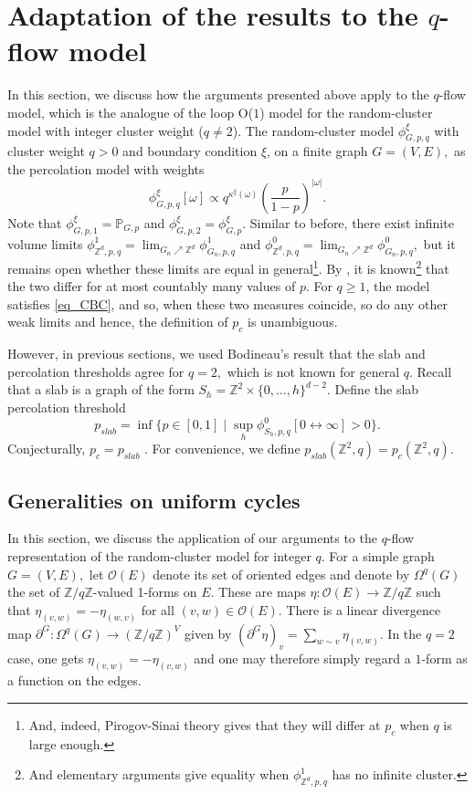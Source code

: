 \documentclass[article,11pt,reqno]{amsart}
\newcommand{\Z}{\mathbb{Z}}
\newcommand{\cc}{\leftrightarrow}
\begin{document}
\section{Adaptation of the results to the \texorpdfstring{$q$}{q}-flow model}\label{sec:qflow}
In this section, we discuss how the arguments presented above apply to the $q$-flow model, which is the analogue of the loop O($1$) model for the random-cluster model with integer cluster weight ($q \neq 2$). The random-cluster model $\phi^{\xi}_{G,p,q}$ with cluster weight $q>0$ and boundary condition $\xi$,  on a finite graph $G=(V,E),$ as the percolation model with weights
$$
\phi^{\xi}_{G,p,q}[\omega]\propto q^{\kappa^{\xi}(\omega)}\left( \frac{p}{1-p}\right)^{|\omega|}.
$$
Note that $\phi^{\xi}_{G,p,1}=\mathbb{P}_{G,p}$ and $\phi^{\xi}_{G,p,2}=\phi^{\xi}_{G,p}$. Similar to before, there exist infinite volume limits $\phi^1_{\mathbb{Z}^d,p,q}=\lim_{G_n\nearrow \mathbb{Z}^d} \phi^1_{G_n,p,q}$ and $\phi^0_{\mathbb{Z}^d,p,q}=\lim_{G_n\nearrow \mathbb{Z}^d} \phi^0_{G_n,p,q},$ but it remains open whether these limits are equal in general\footnote{And, indeed, Pirogov-Sinai theory \cite{Pirogov-Sinai-FK} gives that they will differ at $p_c$ when $q$ is large enough.}. By \cite{Convexity_of_pressure}, it is known\footnote{And elementary arguments give equality when $\phi_{\Z^d,p,q}^1$ has no infinite cluster.} that the two differ for at most countably many values of $p$. For $q \geq 1$, the model satisfies \eqref{eq_CBC}, and so, when these two measures coincide, so do any other weak limits and hence, the definition of $p_c$ is unambiguous.

 However, in previous sections, we used Bodineau's result \cite{Bod05} that the slab and percolation thresholds agree for $q=2,$ which is not known for general $q$. Recall that a slab is a graph of the form $S_h=\mathbb{Z}^2\times \{0,\dots,h\}^{d-2}$.  Define the slab percolation threshold 
 $$
 p_{slab}=\inf\{p\in [0,1]\mid \sup_h\phi^0_{S_h,p,q}[0\cc \infty]>0\}.
 $$
 Conjecturally, $p_c=p_{slab}$ \cite{Pis96}. For convenience, we define $p_{slab}(\Z^2,q) = p_c(\Z^2,q)$.
\subsection{Generalities on uniform cycles}

In this section, we discuss the application of our arguments to the $q$-flow representation of the random-cluster model for integer $q$. For a simple graph $G=(V,E),$ let $\mathcal{O}(E)$ denote its set of oriented edges and denote by $\Omega^q(G)$ the set of $\mathbb{Z}/q\mathbb{Z}$-valued 1-forms on $E.$ These are maps $\eta:\mathcal{O}(E)\to \mathbb{Z}/q\mathbb{Z}$ such that $\eta_{(v,w)}=-\eta_{(w,v)}$ for all $(v,w)\in \mathcal{O}(E)$. There is a linear divergence map $\partial^G:\Omega^q(G)\to (\mathbb{Z}/q\mathbb{Z})^V$ given by $(\partial^G\eta)_v=\sum_{w\sim v} \eta_{(v,w)}.$ In the $q=2$ case, one gets $\eta_{(v,w)}=-\eta_{(v,w)}$ and one may therefore simply regard a $1$-form as a function on the edges.
\end{document}
